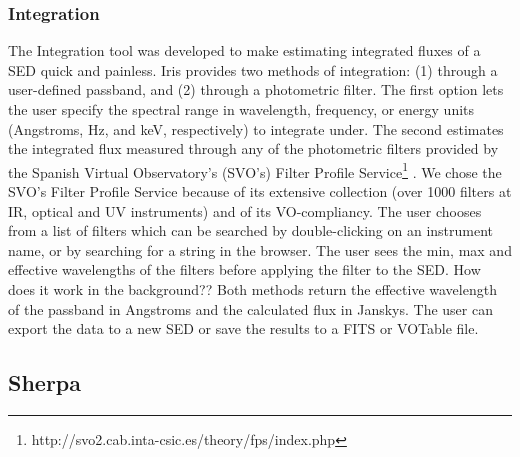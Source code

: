 \subsubsection{Integration}
The Integration tool was developed to make estimating integrated fluxes of a SED quick and painless. Iris provides two methods of integration: (1) through a user-defined passband, and (2) through a photometric filter. The first option lets the user specify the spectral range in wavelength, frequency, or energy units (Angstroms, Hz, and keV, respectively) to integrate under. The second estimates the integrated flux measured through any of the photometric filters provided by the Spanish Virtual Observatory's (SVO's) Filter Profile Service\footnote{http://svo2.cab.inta-csic.es/theory/fps/index.php} \cite{highlighted in 2013arXiv1312.3249S}. We chose the SVO's Filter Profile Service because of its extensive collection (over 1000 filters at IR, optical and UV instruments) and of its VO-compliancy. The user chooses from a list of filters which can be searched by double-clicking on an instrument name, or by searching for a string in the browser. The user sees the min, max and effective wavelengths of the filters before applying the filter to the SED.
How does it work in the background??
Both methods return the effective wavelength of the passband in Angstroms and the calculated flux in Janskys. The user can export the data to a new SED or save the results to a FITS or VOTable file.

\subsection{Sherpa}
\label{subsec:sherpa}



